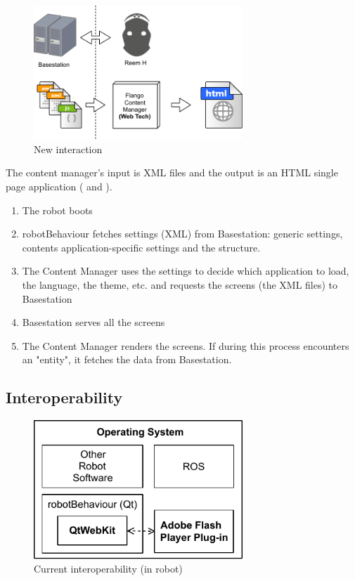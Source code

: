 \begin{figure}[htb]
    \label{fig:interaction-new}
    \centering
    \includegraphics[width=0.7\textwidth]{figures/interaction-new}
    \caption{New interaction}
\end{figure}

The content manager's input is \ac{XML} files and the output is an \ac{HTML} single page application ( and ).

\begin{enumerate}
    \item The robot boots
    \item robotBehaviour fetches settings (\ac{XML}) from Basestation: generic settings, contents application-specific settings and the structure.
    \item The Content Manager uses the settings to decide which application to load, the language, the theme, etc. and requests the screens (the \ac{XML} files) to Basestation
    \item Basestation serves all the screens
    \item The Content Manager renders the screens. If during this process encounters an "entity", it fetches the data from Basestation.
\end{enumerate}


\subsection{Interoperability}
\begin{figure}[htb]
    \label{fig:interoperability-original}
    \centering
    \includegraphics[width=0.7\textwidth]{figures/interoperability-original}
    \caption{Current interoperability (in robot)}
\end{figure}

